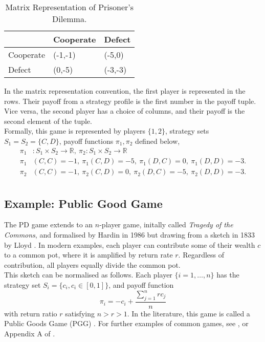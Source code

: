 \begin{center}
\begin{table}[h]
\centering
\begin{tabular}{|l|l|l|}

    

\hline
          & Cooperate & Defect \\ \hline
Cooperate & (-1,-1)     & (-5,0)  \\ \hline
Defect    & (0,-5)     & (-3,-3)  \\ \hline

\end{tabular}
    

\caption{Matrix Representation of Prisoner's Dilemma.}
\label{table:PD}
\end{table}
\end{center} 
In the matrix representation convention, the first player is represented in the rows. Their payoff from a strategy profile is the first number in the payoff tuple. Vice versa, the second player has a choice of columns, and their payoff is the second element of the tuple. \\

Formally, this game is represented by players $\{1,2\}$, strategy sets $S_1 = S_2 = \{C,D\}$, payoff functions $\pi_1, \pi_2$ defined below, 
\begin{align*}
    \pi_1& : S_1 \times S_2 \to \mathbb R, ~ \pi_2: S_1 \times S_2 \to \mathbb R\\
    \pi_1&(C,C) = -1,~ \pi_1(C,D) = -5,~ \pi_1(D,C) = 0,~ \pi_1(D,D) = -3.\\
    \pi_2&(C,C) = -1,~ \pi_2(C,D) = 0,~ \pi_2(D,C) = -5,~ \pi_2(D,D) = -3.\\
\end{align*}

\subsection{Example: Public Good Game} \label{PGG} \label{ToTC}

The PD game extends to an $n$-player game, initally called \emph{Tragedy of the Commons}, and formalised by Hardin in 1986 but drawing from a sketch in 1833 by Lloyd \cite{RN82}. In modern examples, each player can contribute some of their wealth $c$ to a common pot, where it is amplified by return rate  $r$. Regardless of contribution, all players equally divide the common pot.  \\

This sketch can be normalised as follows. Each player $\{ i = 1,\dots,n\}$ has the strategy set $S_i = \{c_i, c_i \in [0,1] \}$, and payoff function $$\pi_i = -c_i + \frac{\sum_{j =1}^n r c_j}{n}$$ with return ratio $r$ satisfying $n>r>1$. In the literature, this game is called a Public Goods Game (PGG) \cite{RN67}. For further examples of common games, see \cite{RN79}, or Appendix A of \cite{RN99}.  \\

